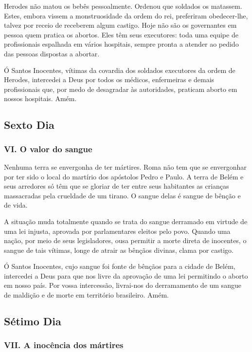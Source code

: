 \documentclass[11pt]{article}
\begin{document}
Herodes não matou os bebês pessoalmente. Ordenou que soldados os matassem. Estes, embora vissem a monstruosidade da ordem do rei, preferiram obedecer-lhe, talvez por receio de receberem algum castigo. Hoje não são os governantes em pessoa quem pratica os abortos. Eles têm seus executores: toda uma equipe de profissionais espalhada em vários hospitais, sempre pronta a atender ao pedido das pessoas dispostas a abortar.

Ó Santos Inocentes, vítimas da covardia dos soldados executores da ordem de Herodes, intercedei a Deus por todos os médicos, enfermeiras e demais profissionais que, por medo de desagradar às autoridades, praticam aborto em nossos hospitais. Amém.

\subsection{Sexto Dia}
\subsubsection*{VI. O valor do sangue}

Nenhuma terra se envergonha de ter mártires. Roma não tem que se envergonhar por ter sido o local do martírio dos apóstolos Pedro e Paulo. A terra de Belém e seus arredores só têm que se gloriar de ter entre seus habitantes as crianças massacradas pela crueldade de um tirano. O sangue delas é sangue de bênção e de vida.

A situação muda totalmente quando se trata do sangue derramado em virtude de uma lei injusta, aprovada por parlamentares eleitos pelo povo. Quando uma nação, por meio de seus legisladores, ousa permitir a morte direta de inocentes, o sangue de tais vítimas, longe de atrair as bênçãos divinas, clama por castigo.

Ó Santos Inocentes, cujo sangue foi fonte de bênçãos para a cidade de Belém, intercedei a Deus para que nos livre da aprovação de uma lei permitindo o aborto em nosso país. Por vossa intercessão, livrai-nos do derramamento de um sangue de maldição e de morte em território brasileiro. Amém.

\subsection{Sétimo Dia}
\subsubsection*{VII. A inocência dos mártires}
\end{document}
